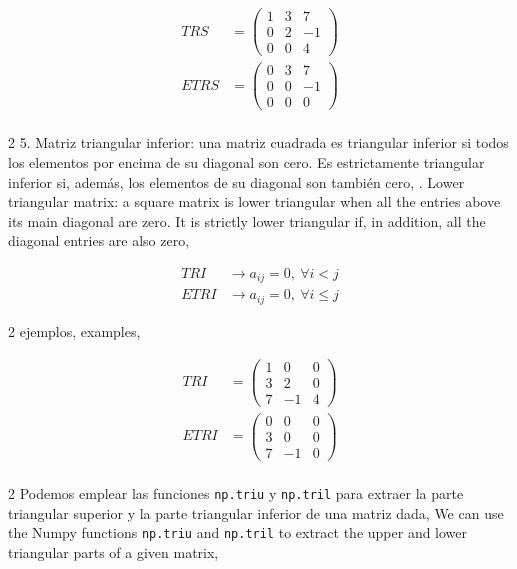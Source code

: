 \begin{align*}
TRS&=\begin{pmatrix}
1 & 3 & 7\\
0 & 2 & -1\\
0 & 0 & 4
\end{pmatrix}\\
ETRS&=\begin{pmatrix}
0 & 3 & 7\\
0 & 0 & -1\\
0 & 0 & 0
\end{pmatrix}\\
\end{align*}
\begin{paracol}{2}
5. Matriz triangular inferior: una matriz cuadrada es triangular inferior si todos los elementos por encima de su diagonal son cero. Es estrictamente triangular inferior si, además, los elementos de su diagonal son también cero,
. Lower triangular matrix: a square matrix is lower triangular when all the entries above its main diagonal are zero. It is strictly lower triangular if, in addition, all the diagonal entries are also zero, 
\end{paracol}
\begin{align*}
TRI& \rightarrow a_{ij} = 0, \ \forall i < j \\
ETRI& \rightarrow a_{ij} = 0, \ \forall i\leq j 
\end{align*}
\begin{paracol}{2}
ejemplos,
\switchcolumn
examples,
\end{paracol}

\begin{align*}
TRI&=\begin{pmatrix}
1 & 0 & 0\\
3 & 2 & 0\\
7 & -1 & 4
\end{pmatrix}\\
ETRI&=\begin{pmatrix}
0 & 0 & 0\\
3 & 0 & 0\\
7 & -1 & 0
\end{pmatrix}\\
\end{align*}

\begin{paracol}{2}
	Podemos emplear las funciones \texttt{np.triu} y \texttt{np.tril} para extraer la parte triangular superior y la parte triangular inferior de una matriz dada,
	\switchcolumn
	We can use the Numpy functions \texttt{np.triu} and \texttt{np.tril} to extract the upper and lower triangular parts of a given matrix,
\end{paracol}

